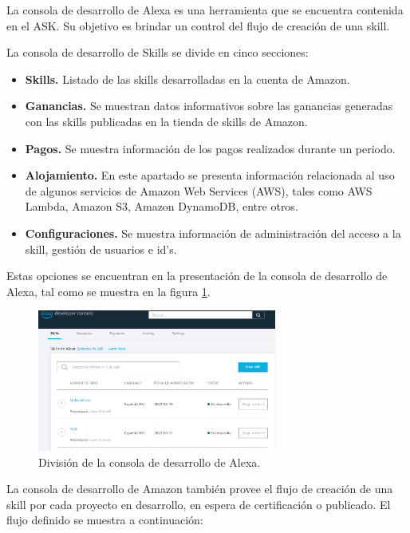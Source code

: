 La consola de desarrollo de Alexa es una herramienta que se encuentra contenida en el ASK. Su objetivo es brindar un control del flujo de creación de una skill.

La consola de desarrollo de Skills se divide en cinco secciones:

\begin{itemize}
  \item \textbf{Skills.} Listado de las skills desarrolladas en la cuenta de Amazon.
  \item \textbf{Ganancias.} Se muestran datos informativos sobre las ganancias generadas con las skills publicadas en la tienda de skills de Amazon.
  \item \textbf{Pagos.} Se muestra información de los pagos realizados durante un periodo.
  \item \textbf{Alojamiento.} En este apartado se presenta información relacionada al uso de algunos servicios de Amazon Web Services (AWS), tales como AWS Lambda, Amazon S3, Amazon DynamoDB, entre otros.
  \item \textbf{Configuraciones.} Se muestra información de administración del acceso a la skill, gestión de usuarios e id's.
\end{itemize}

Estas opciones se encuentran en la presentación de la consola de desarrollo de Alexa, tal como se muestra en la figura \ref{fig:43}.

\begin{figure}
  \centering
  \includegraphics[width=0.70\textwidth]{Cap4/Figuras/Consola de Desarrollo de Alexa.png}
  \caption{División de la consola de desarrollo de Alexa.}
  \label{fig:43}
\end{figure}

La consola de desarrollo de Amazon también provee el flujo de creación de una skill por cada proyecto en desarrollo, en espera de certificación o publicado. El flujo definido se muestra a continuación:

